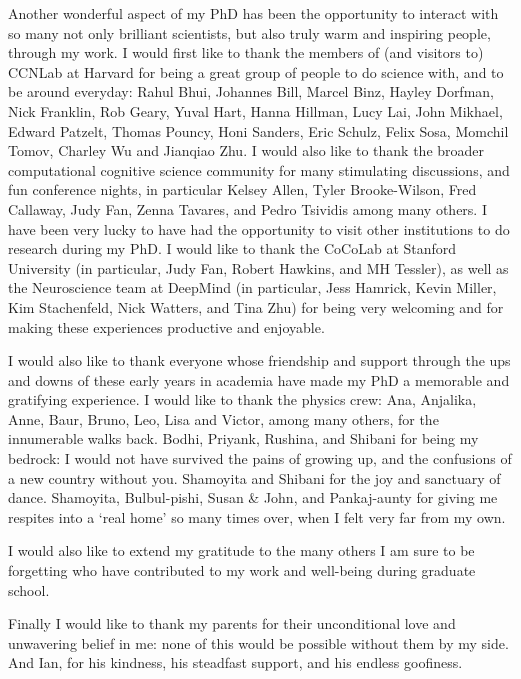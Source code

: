 Another wonderful aspect of my PhD has been the opportunity to interact with so many not only brilliant scientists, but also truly warm and inspiring people, through my work. I would first like to thank the members of (and visitors to) CCNLab at Harvard for being a great group of people to do science with, and to be around everyday: Rahul Bhui, Johannes Bill, Marcel Binz, Hayley Dorfman, Nick Franklin, Rob Geary, Yuval Hart, Hanna Hillman, Lucy Lai, John Mikhael, Edward Patzelt, Thomas Pouncy, Honi Sanders, Eric Schulz, Felix Sosa,  Momchil Tomov, Charley Wu and Jianqiao Zhu. I would also like to thank the broader computational cognitive science community for many stimulating discussions, and fun conference nights, in particular Kelsey Allen, Tyler Brooke-Wilson, Fred Callaway, Judy Fan,  Zenna Tavares, and Pedro Tsividis among many others. I have been very lucky to have had the opportunity to visit other institutions to do research during my PhD. I would like to thank the CoCoLab at Stanford University (in particular, Judy Fan, Robert Hawkins, and MH Tessler), as well as the Neuroscience team at DeepMind (in particular, Jess Hamrick, Kevin Miller, Kim Stachenfeld, Nick Watters, and Tina Zhu) for being very welcoming and for making these experiences productive and enjoyable.

I would also like to thank everyone whose friendship and support through the ups and downs of these early years in academia have made my PhD a memorable and gratifying experience. I would like to thank the physics crew: Ana, Anjalika, Anne, Baur, Bruno, Leo, Lisa and Victor, among many others, for the innumerable walks back. Bodhi, Priyank, Rushina, and Shibani for being my bedrock: I would not have survived the pains of growing up, and the confusions of a new country without you. Shamoyita and Shibani for the joy and sanctuary of dance. Shamoyita, Bulbul-pishi, Susan \& John, and Pankaj-aunty for giving me respites into a `real home' so many times over, when I felt very far from my own.

I would also like to extend my gratitude to the many others I am sure to be forgetting who have contributed to my work and well-being during graduate school.


Finally I would like to thank my parents for their unconditional love and unwavering belief in me: none of this would be possible without them by my side. And Ian, for his kindness, his steadfast support, and his endless goofiness.

%
%
%
%
%
%
%
%



